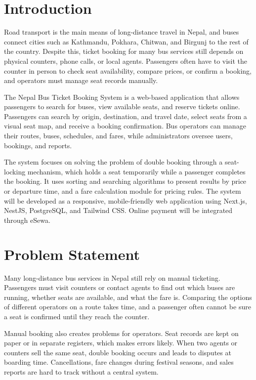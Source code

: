 
\section{Introduction}

Road transport is the main means of long-distance travel in Nepal, and buses connect cities such as Kathmandu, Pokhara, Chitwan, and Birgunj to the rest of the country. Despite this, ticket booking for many bus services still depends on physical counters, phone calls, or local agents. Passengers often have to visit the counter in person to check seat availability, compare prices, or confirm a booking, and operators must manage seat records manually.

The Nepal Bus Ticket Booking System is a web-based application that allows passengers to search for buses, view available seats, and reserve tickets online. Passengers can search by origin, destination, and travel date, select seats from a visual seat map, and receive a booking confirmation. Bus operators can manage their routes, buses, schedules, and fares, while administrators oversee users, bookings, and reports.

The system focuses on solving the problem of double booking through a seat-locking mechanism, which holds a seat temporarily while a passenger completes the booking. It uses sorting and searching algorithms to present results by price or departure time, and a fare calculation module for pricing rules. The system will be developed as a responsive, mobile-friendly web application using Next.js, NestJS, PostgreSQL, and Tailwind CSS. Online payment will be integrated through eSewa.

\section{Problem Statement}

Many long-distance bus services in Nepal still rely on manual ticketing. Passengers must visit counters or contact agents to find out which buses are running, whether seats are available, and what the fare is. Comparing the options of different operators on a route takes time, and a passenger often cannot be sure a seat is confirmed until they reach the counter.

Manual booking also creates problems for operators. Seat records are kept on paper or in separate registers, which makes errors likely. When two agents or counters sell the same seat, double booking occurs and leads to disputes at boarding time. Cancellations, fare changes during festival seasons, and sales reports are hard to track without a central system.

